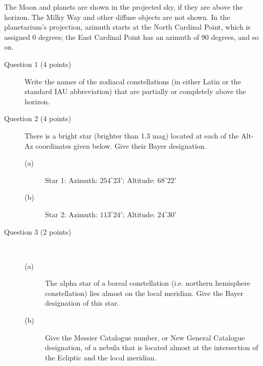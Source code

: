 The Moon and planets are shown in the projected sky, if they are above the
horizon. The Milky Way and other diffuse objects are not shown. In the
planetarium's projection, azimuth starts at the North Cardinal Point, which
is assigned 0 degrees; the East Cardinal Point has an azimuth of 90 degrees,
and so on.

\begin{description}
\item[Question 1 (4 points)] Write the names of the zodiacal constellations
  (in either Latin or the standard IAU abbreviation) that are partially or
  completely above the horizon.
\item[Question 2 (4 points)] There is a bright star (brighter than 1.3 mag)
  located at each of the Alt-Az coordinates given below. Give their Bayer
  designation.
  \begin{description}
  \item[(a)] Star 1: Azimuth: $254^\circ 23'$; Altitude: $68^\circ 22'$
  \item[(b)] Star 2: Azimuth: $113^\circ 24'$; Altitude: $24^\circ 30'$
  \end{description}
\item[Question 3 (2 points)]~
  \begin{description}
  \item[(a)] The alpha star of a boreal constellation (i.e. northern
    hemisphere constellation) lies almost on the local meridian. Give the
    Bayer designation of this star.
  \item[(b)] Give the Messier Catalogue number, or New General Catalogue
    designation, of a nebula that is located almost at the intersection of
    the Ecliptic and the local meridian.
  \end{description}
\end{description}
